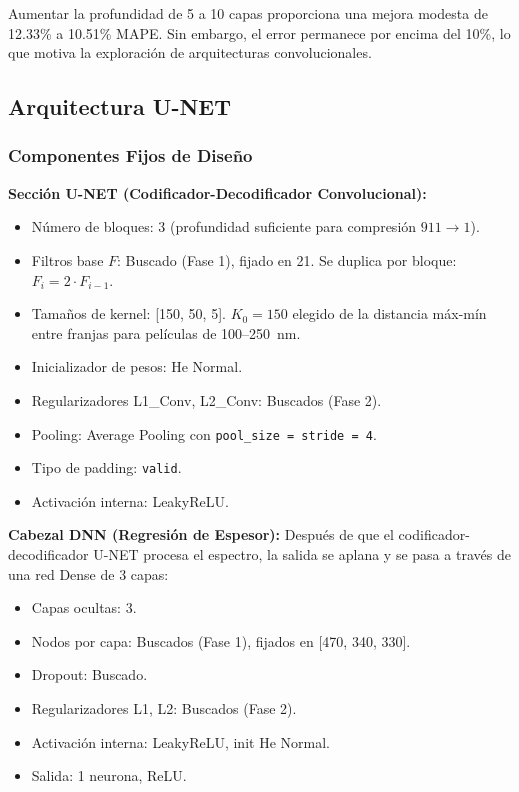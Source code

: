 \documentclass{article}
\begin{document}
Aumentar la profundidad de 5 a 10 capas proporciona una mejora modesta de 12.33\% a 10.51\% MAPE. Sin embargo, el error permanece por encima del 10\%, lo que motiva la exploración de arquitecturas convolucionales.

\subsection{Arquitectura U-NET}

\subsubsection{Componentes Fijos de Diseño}

\textbf{Sección U-NET (Codificador-Decodificador Convolucional):}
\begin{itemize}
\item Número de bloques: 3 (profundidad suficiente para compresión $911 \rightarrow 1$).
\item Filtros base $F$: Buscado (Fase 1), fijado en 21. Se duplica por bloque: $F_i = 2 \cdot F_{i-1}$.
\item Tamaños de kernel: [150, 50, 5]. $K_0 = 150$ elegido de la distancia máx-mín entre franjas para películas de 100--250~nm.
\item Inicializador de pesos: He Normal.
\item Regularizadores L1\_Conv, L2\_Conv: Buscados (Fase 2).
\item Pooling: Average Pooling con \texttt{pool\_size = stride = 4}.
\item Tipo de padding: \texttt{valid}.
\item Activación interna: LeakyReLU.
\end{itemize}

\textbf{Cabezal DNN (Regresión de Espesor):}
Después de que el codificador-decodificador U-NET procesa el espectro, la salida se aplana y se pasa a través de una red Dense de 3 capas:
\begin{itemize}
\item Capas ocultas: 3.
\item Nodos por capa: Buscados (Fase 1), fijados en [470, 340, 330].
\item Dropout: Buscado.
\item Regularizadores L1, L2: Buscados (Fase 2).
\item Activación interna: LeakyReLU, init He Normal.
\item Salida: 1 neurona, ReLU.
\end{itemize}
\end{document}
